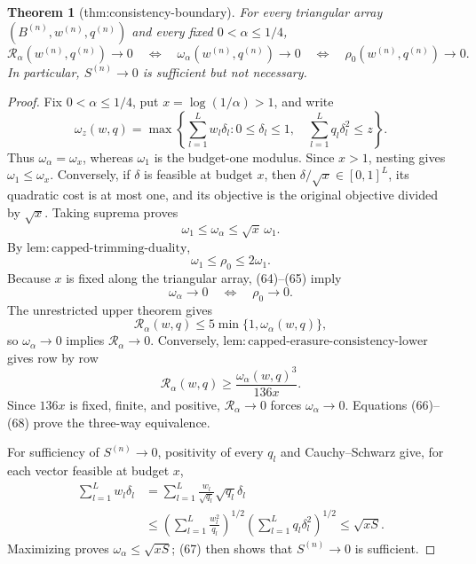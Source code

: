 \documentclass{article}
\newtheorem{theorem}{Theorem}
\begin{document}
\begin{theorem}[thm:consistency-boundary]\label{thm:consistency-boundary}
For every triangular array \((B^{(n)},w^{(n)},q^{(n)})\) and every fixed \(0<\alpha\le1/4\), \[\mathcal R_\alpha(w^{(n)},q^{(n)})\to0\quad\Longleftrightarrow\quad\omega_\alpha(w^{(n)},q^{(n)})\to0\quad\Longleftrightarrow\quad\rho_0(w^{(n)},q^{(n)})\to0.\] In particular, \(S^{(n)}\to0\) is sufficient but not necessary.
\end{theorem}
\begin{proof}
Fix \(0<\alpha\le1/4\), put \(x=\log(1/\alpha)>1\), and write
\[
 \omega_z(w,q)=\max\left\{\sum_{l=1}^Lw_l\delta_l:
 0\le\delta_l\le1,\quad
 \sum_{l=1}^Lq_l\delta_l^2\le z\right\}.
\tag{63}
\]
Thus \(\omega_\alpha=\omega_x\), whereas \(\omega_1\) is the budget-one modulus. Since \(x>1\), nesting gives \(\omega_1\le\omega_x\). Conversely, if \(\delta\) is feasible at budget \(x\), then \(\delta/\sqrt{x}\in[0,1]^L\), its quadratic cost is at most one, and its objective is the original objective divided by \(\sqrt{x}\). Taking suprema proves
\[
 \omega_1\le\omega_\alpha\le\sqrt{x}\,\omega_1.
\tag{64}
\]
By \(\mathrm{lem{:}capped\text{-}trimming\text{-}duality}\),
\[
 \omega_1\le\rho_0\le2\omega_1.
\tag{65}
\]
Because \(x\) is fixed along the triangular array, (64)--(65) imply
\[
 \omega_\alpha\to0\quad\Longleftrightarrow\quad\rho_0\to0.
\tag{66}
\]
The unrestricted upper theorem gives
\[
 \mathcal R_\alpha(w,q)\le5\min\{1,\omega_\alpha(w,q)\},
\tag{67}
\]
so \(\omega_\alpha\to0\) implies \(\mathcal R_\alpha\to0\). Conversely, \(\mathrm{lem{:}capped\text{-}erasure\text{-}consistency\text{-}lower}\) gives row by row
\[
 \mathcal R_\alpha(w,q)\ge\frac{\omega_\alpha(w,q)^3}{136x}.
\tag{68}
\]
Since \(136x\) is fixed, finite, and positive, \(\mathcal R_\alpha\to0\) forces \(\omega_\alpha\to0\). Equations (66)--(68) prove the three-way equivalence.

For sufficiency of \(S^{(n)}\to0\), positivity of every \(q_l\) and Cauchy--Schwarz give, for each vector feasible at budget \(x\),
\[
\begin{aligned}
 \sum_{l=1}^Lw_l\delta_l
 &=\sum_{l=1}^L\frac{w_l}{\sqrt{q_l}}\sqrt{q_l}\delta_l\\
 &\le\left(\sum_{l=1}^L\frac{w_l^2}{q_l}\right)^{1/2}
       \left(\sum_{l=1}^Lq_l\delta_l^2\right)^{1/2}
 \le\sqrt{xS}.
\end{aligned}
\tag{69}
\]
Maximizing proves \(\omega_\alpha\le\sqrt{xS}\); (67) then shows that \(S^{(n)}\to0\) is sufficient.


\end{proof}
\end{document}

